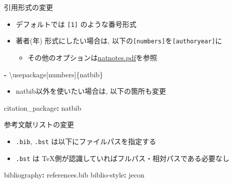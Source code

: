 \documentclass[
  12pt,
  ignorenonframetext,
]{beamer}
\newenvironment{Shaded}{\begin{snugshade}}{\end{snugshade}}
\newcommand{\AttributeTok}[1]{\textcolor[rgb]{0.77,0.63,0.00}{#1}}
\newcommand{\FunctionTok}[1]{\textcolor[rgb]{0.00,0.00,0.00}{#1}}
\newcommand{\KeywordTok}[1]{\textcolor[rgb]{0.13,0.29,0.53}{\textbf{#1}}}
\providecommand{\tightlist}{%
  \setlength{\itemsep}{0pt}\setlength{\parskip}{0pt}}
\begin{document}
\begin{frame}[fragile]{引用形式の変更}
\protect\hypertarget{ux5f15ux7528ux5f62ux5f0fux306eux5909ux66f4}{}

\begin{itemize}
\tightlist
\item
  デフォルトでは \texttt{{[}1{]}} のような番号形式
\item
  著者(年) 形式にしたい場合は,
  以下の\texttt{{[}numbers{]}}を\texttt{{[}authoryear{]}}に

  \begin{itemize}
  \tightlist
  \item
    その他のオプションは\href{http://texdoc.net/texmf-dist/doc/latex/natbib/natnotes.pdf}{natnotes.pdf}を参照
  \end{itemize}
\end{itemize}

\begin{Shaded}
\begin{Highlighting}[]
\KeywordTok{-}\AttributeTok{ \textbackslash{}usepackage[numbers]\{natbib\}}
\end{Highlighting}
\end{Shaded}

\begin{itemize}
\tightlist
\item
  natbib以外を使いたい場合は, 以下の箇所も変更
\end{itemize}

\begin{Shaded}
\begin{Highlighting}[]
\FunctionTok{citation_package}\KeywordTok{:}\AttributeTok{ natbib}
\end{Highlighting}
\end{Shaded}

\end{frame}

\begin{frame}[fragile]{参考文献リストの変更}
\protect\hypertarget{ux53c2ux8003ux6587ux732eux30eaux30b9ux30c8ux306eux5909ux66f4}{}

\begin{itemize}
\tightlist
\item
  \texttt{.bib}, \texttt{.bst} は以下にファイルパスを指定する
\item
  \texttt{.bst} は TeX側が認識していればフルパス・相対パスである必要なし
\end{itemize}

\begin{Shaded}
\begin{Highlighting}[]
\FunctionTok{bibliography}\KeywordTok{:}\AttributeTok{ references.bib}
\FunctionTok{biblio-style}\KeywordTok{:}\AttributeTok{ jecon}
\end{Highlighting}
\end{Shaded}

\end{frame}
\end{document}
